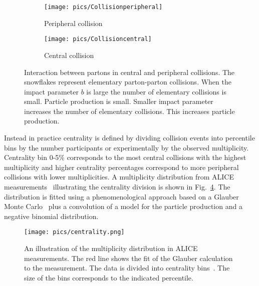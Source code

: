 \begin{figure}[h!]
\centering
        \begin{subfigure}[b]{0.45\textwidth}
                \centering
            	\texttt{[image: pics/Collisionperipheral]}
                \caption{Peripheral collision}
                \label{fig:peripheral}
        \end{subfigure}
        \begin{subfigure}[b]{0.45\textwidth}
                \centering
               \texttt{[image: pics/Collisioncentral]}
                \caption{Central collision}
                \label{fig:central}
        \end{subfigure}
        \caption[Interaction between partons in central and peripheral collisions.]{Interaction between partons in central and peripheral collisions. The snowflakes represent elementary parton-parton collisions. When the impact parameter $b$ is large the number of elementary collisions is small. Particle production is small. Smaller impact parameter increases the number of elementary collisions. This increases  particle production.}\label{fig:collisionA}
\end{figure}

Instead in practice centrality is defined by dividing collision events into percentile bins by the number participants or experimentally by the observed multiplicity. Centrality bin 0-5\% corresponds to the most central collisions with the highest multiplicity and higher centrality percentages correspond to more peripheral collisions with lower multiplicities. A multiplicity distribution from ALICE measurements~\cite{PhysRevC.88.044909} illustrating the centrality division is shown in Fig.~\ref{fig:centrality}. The distribution is fitted using a phenomenological approach based on a Glauber Monte Carlo~\cite{Miller:2007ri} plus a convolution of a model for the particle production and a negative binomial distribution. 


\begin{figure}[htb]
\centering

               \texttt{[image: pics/centrality.png]}
        \caption[An illustration of the multiplicity distribution in ALICE measurement with centrality classes.]{An illustration of the multiplicity distribution in ALICE measurements. The red line shows
the fit of the Glauber calculation to the measurement. The data is divided into centrality bins~\cite{PhysRevC.88.044909}. The size of the bins corresponds to the indicated percentile.}
        	\label{fig:centrality}
\end{figure}

